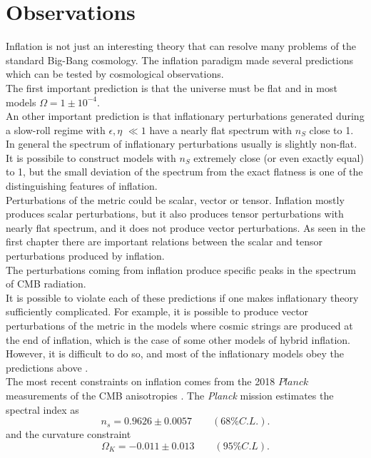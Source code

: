 \documentclass[11pt,a4paper,twoside]{book}
\begin{document}
\section{Observations}
Inflation is not just an interesting theory  that can resolve many problems of the standard Big-Bang cosmology. The inflation paradigm made several predictions which can be tested by cosmological observations.\\
The first important prediction is that the universe must be flat and in most models $ \Omega = 1 \pm 10^{-4} $.\\
 An other important prediction is that  inflationary perturbations generated during a slow-roll regime with $\epsilon,\eta$ $\ll 1$ have a nearly flat spectrum with $ n_{S}$ close to 1. In general the spectrum of inflationary perturbations usually is slightly non-flat. It is possibile to construct models with $ n_{S}$ extremely close (or even exactly equal) to 1, but the small deviation of the spectrum from the exact flatness is one of the distinguishing features of inflation.\\
 Perturbations of the metric could be scalar, vector or tensor. Inflation mostly produces scalar perturbations, but it also produces tensor perturbations with nearly flat spectrum, and it does not produce vector perturbations. As seen in the first chapter  there are important relations between the scalar and tensor perturbations produced by inflation.\\
 The perturbations coming from inflation produce specific peaks in the spectrum of CMB radiation.\\
 It is possible to violate each of these predictions if one makes inflationary theory sufficiently complicated. For example, it is possible to produce vector perturbations of the metric in the models where cosmic strings are produced at the end of inflation, which is the case of some other models of hybrid inflation. However, it is difficult to do so, and most of the inflationary models obey the predictions above \cite{Chap2:Linde_HystoryInflation}.\\
 The most recent constraints on inflation comes from the 2018 $ Planck $ measurements of the CMB anisotropies \cite{Chap2:Planck2018}. The \textit{Planck} mission estimates the spectral index as
 \begin{equation}
 	\label{spectral index}
 	n_{s}= 0.9626 \pm 0.0057  \qquad (68\% C.L.).
 \end{equation}
and the curvature constraint
 \begin{equation}
 	\label{curvatureConstraint}
 	\Omega_{K}= -0.011 \pm 0.013 \qquad  (95\% C.L).
 \end{equation}
\end{document}
